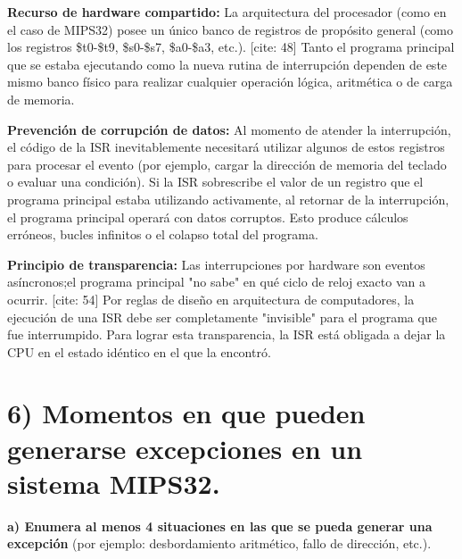 \documentclass[12pt]{article}
\begin{document}
\textbf{Recurso de hardware compartido:} La arquitectura del procesador (como en el caso de MIPS32) posee un único banco de registros de propósito general (como los registros \$t0-\$t9, \$s0-\$s7, \$a0-\$a3, etc.). [cite: 48] Tanto el programa principal que se estaba ejecutando como la nueva rutina de interrupción dependen de este mismo banco físico para realizar cualquier operación lógica, aritmética o de carga de memoria. 

\textbf{Prevención de corrupción de datos:} Al momento de atender la interrupción, el código de la ISR inevitablemente necesitará utilizar algunos de estos registros para procesar el evento (por ejemplo, cargar la dirección de memoria del teclado o evaluar una condición).  Si la ISR sobrescribe el valor de un registro que el programa principal estaba utilizando activamente, al retornar de la interrupción, el programa principal operará con datos corruptos.  Esto produce cálculos erróneos, bucles infinitos o el colapso total del programa. 

\textbf{Principio de transparencia:} Las interrupciones por hardware son eventos asíncronos;el programa principal "no sabe" en qué ciclo de reloj exacto van a ocurrir. [cite: 54] Por reglas de diseño en arquitectura de computadores, la ejecución de una ISR debe ser completamente "invisible" para el programa que fue interrumpido.  Para lograr esta transparencia, la ISR está obligada a dejar la CPU en el estado idéntico en el que la encontró. 

\vspace{1cm}

\section*{6) Momentos en que pueden generarse excepciones en un sistema MIPS32.}

\textbf{a) Enumera al menos 4 situaciones en las que se pueda generar una excepción} (por ejemplo: desbordamiento aritmético, fallo de dirección, etc.).
\end{document}
